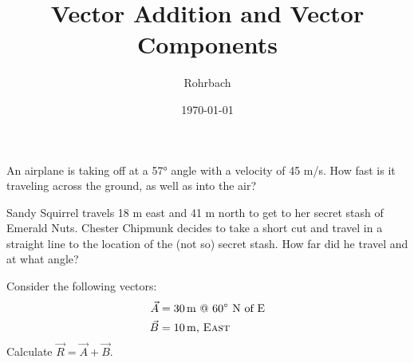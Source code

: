 \documentclass[10pt]{exam}
\title{Vector Addition and Vector Components}
\author{Rohrbach}
\date{\today}
\begin{document}
\maketitle

\begin{questions}

\question
  An airplane is taking off at a 57° angle with a velocity of 45 m/s.  How fast is it traveling across the ground, as well as into the air?
  \vs
  
\question
  Sandy Squirrel travels 18 m east and 41 m north to get to her secret stash of Emerald Nuts.  Chester Chipmunk decides to take a short cut and travel in a straight line to the location of the (not so) secret stash.  How far did he travel and at what angle?
  \vs


\question

  Consider the following vectors:
  \begin{align*}
    \vec{A} &= \SI{30}{m} \text{ @ 60$^\circ$ N of E} \\
    \vec{B} &= \SI{10}{m} \text{, \sc East}
  \end{align*}
  Calculate $\vec{R}=\vec{A}+\vec{B}$.

  \vs[3]
  
\end{questions}
\end{document}
